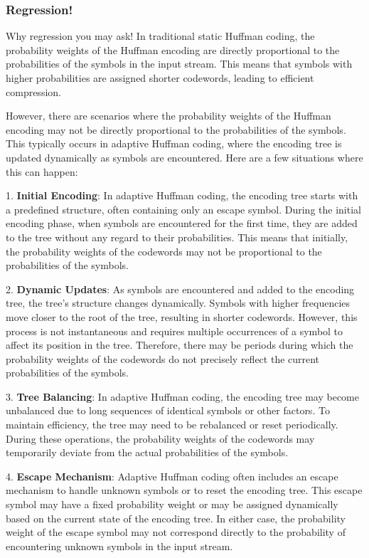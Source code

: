 \documentclass[scrartcl]{article}
\begin{document}
\subsubsection{Regression!}
Why regression you may ask!
In traditional static Huffman coding, the probability weights of the Huffman encoding are directly proportional to the probabilities of the symbols in the input stream. This means that symbols with higher probabilities are assigned shorter codewords, leading to efficient compression.

However, there are scenarios where the probability weights of the Huffman encoding may not be directly proportional to the probabilities of the symbols. This typically occurs in adaptive Huffman coding, where the encoding tree is updated dynamically as symbols are encountered. Here are a few situations where this can happen:

1. \textbf{Initial Encoding}: In adaptive Huffman coding, the encoding tree starts with a predefined structure, often containing only an escape symbol. During the initial encoding phase, when symbols are encountered for the first time, they are added to the tree without any regard to their probabilities. This means that initially, the probability weights of the codewords may not be proportional to the probabilities of the symbols.

2. \textbf{Dynamic Updates}: As symbols are encountered and added to the encoding tree, the tree's structure changes dynamically. Symbols with higher frequencies move closer to the root of the tree, resulting in shorter codewords. However, this process is not instantaneous and requires multiple occurrences of a symbol to affect its position in the tree. Therefore, there may be periods during which the probability weights of the codewords do not precisely reflect the current probabilities of the symbols.

3. \textbf{Tree Balancing}: In adaptive Huffman coding, the encoding tree may become unbalanced due to long sequences of identical symbols or other factors. To maintain efficiency, the tree may need to be rebalanced or reset periodically. During these operations, the probability weights of the codewords may temporarily deviate from the actual probabilities of the symbols.

4. \textbf{Escape Mechanism}: Adaptive Huffman coding often includes an escape mechanism to handle unknown symbols or to reset the encoding tree. This escape symbol may have a fixed probability weight or may be assigned dynamically based on the current state of the encoding tree. In either case, the probability weight of the escape symbol may not correspond directly to the probability of encountering unknown symbols in the input stream.
\end{document}
